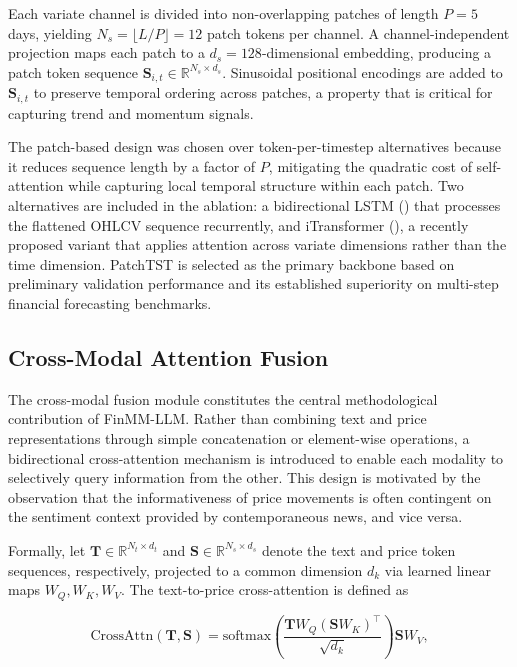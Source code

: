 \documentclass[
  11pt,
  a4paper,
]{article}
\begin{document}
Each variate channel is divided into non-overlapping patches of length
\(P = 5\) days, yielding \(N_s = \lfloor L / P \rfloor = 12\) patch
tokens per channel. A channel-independent projection maps each patch to
a \(d_s = 128\)-dimensional embedding, producing a patch token sequence
\(\mathbf{S}_{i,t} \in \mathbb{R}^{N_s \times d_s}\). Sinusoidal
positional encodings are added to \(\mathbf{S}_{i,t}\) to preserve
temporal ordering across patches, a property that is critical for
capturing trend and momentum signals.

The patch-based design was chosen over token-per-timestep alternatives
because it reduces sequence length by a factor of \(P\), mitigating the
quadratic cost of self-attention while capturing local temporal
structure within each patch. Two alternatives are included in the
ablation: a bidirectional LSTM () that processes the flattened OHLCV sequence
recurrently, and iTransformer (), a recently proposed variant that applies attention across
variate dimensions rather than the time dimension. PatchTST is selected
as the primary backbone based on preliminary validation performance and
its established superiority on multi-step financial forecasting
benchmarks.

\subsection{Cross-Modal Attention Fusion}\label{sec-fusion}

The cross-modal fusion module constitutes the central methodological
contribution of FinMM-LLM. Rather than combining text and price
representations through simple concatenation or element-wise operations,
a bidirectional cross-attention mechanism is introduced to enable each
modality to selectively query information from the other. This design is
motivated by the observation that the informativeness of price movements
is often contingent on the sentiment context provided by contemporaneous
news, and vice versa.

Formally, let \(\mathbf{T} \in \mathbb{R}^{N_t \times d_t}\) and
\(\mathbf{S} \in \mathbb{R}^{N_s \times d_s}\) denote the text and price
token sequences, respectively, projected to a common dimension \(d_k\)
via learned linear maps \(W_Q, W_K, W_V\). The text-to-price
cross-attention is defined as

\[\mathrm{CrossAttn}(\mathbf{T}, \mathbf{S}) = \mathrm{softmax}\!\left(\frac{\mathbf{T} W_Q \left(\mathbf{S} W_K\right)^\top}{\sqrt{d_k}}\right) \mathbf{S} W_V,\]
\end{document}
